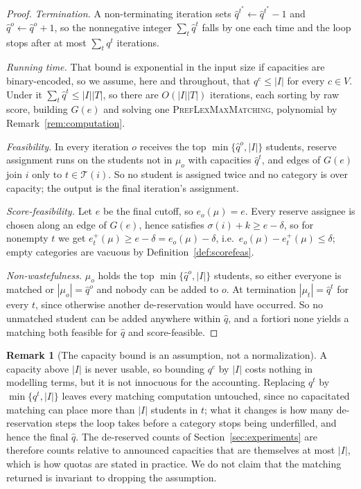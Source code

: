 \documentclass[a4paper,twoside]{article}
\theoremstyle{definition}
\newtheorem{nremark}{Remark}
\renewcommand{\T}{\mathcal{T}}
\begin{document}
\begin{proof}
\emph{Termination.} A non-terminating iteration sets $\hat q^{t^\ast}\gets\hat q^{t^\ast}-1$ and $\hat q^o\gets\hat q^o+1$, so the nonnegative integer $\sum_{t}\hat q^t$ falls by one each time and the loop stops after at most $\sum_t q^t$ iterations.

\emph{Running time.} That bound is exponential in the input size if capacities are binary-encoded, so we assume, here and throughout, that $q^c\le|I|$ for every $c\in V$. Under it $\sum_t\hat q^t\le|I||T|$, so there are $O(|I||T|)$ iterations, each sorting by raw score, building $G(e)$ and solving one \textsc{PrefLexMaxMatching}, polynomial by Remark~\ref{rem:computation}.

\emph{Feasibility.} In every iteration $o$ receives the top $\min\{\hat q^o,|I|\}$ students, reserve assignment runs on the students not in $\mu_o$ with capacities $\hat q^t$, and edges of $G(e)$ join $i$ only to $t\in\T(i)$. So no student is assigned twice and no category is over capacity; the output is the final iteration's assignment.

\emph{Score-feasibility.} Let $e$ be the final cutoff, so $e_o(\mu)=e$. Every reserve assignee is chosen along an edge of $G(e)$, hence satisfies $\sigma(i)+k\ge e-\delta$, so for nonempty $t$ we get $e_t^+(\mu)\ge e-\delta=e_o(\mu)-\delta$, i.e.\ $e_o(\mu)-e_t^+(\mu)\le\delta$; empty categories are vacuous by Definition~\ref{def:scorefeas}.

\emph{Non-wastefulness.} $\mu_o$ holds the top $\min\{\hat q^o,|I|\}$ students, so either everyone is matched or $|\mu_o|=\hat q^o$ and nobody can be added to $o$. At termination $|\mu_t|=\hat q^t$ for every $t$, since otherwise another de-reservation would have occurred. So no unmatched student can be added anywhere within $\hat q$, and a fortiori none yields a matching both feasible for $\hat q$ and score-feasible.
\end{proof}

\begin{nremark}[The capacity bound is an assumption, not a normalization]
\label{rem:capbound}
A capacity above $|I|$ is never usable, so bounding $q^c$ by $|I|$ costs nothing in modelling terms, but it is not innocuous for the accounting. Replacing $q^t$ by $\min\{q^t,|I|\}$ leaves every matching computation untouched, since no capacitated matching can place more than $|I|$ students in $t$; what it changes is how many de-reservation steps the loop takes before a category stops being underfilled, and hence the final $\hat q$. The de-reserved counts of Section~\ref{sec:experiments} are therefore counts relative to announced capacities that are themselves at most $|I|$, which is how quotas are stated in practice. We do not claim that the matching returned is invariant to dropping the assumption.
\end{nremark}
\end{document}
